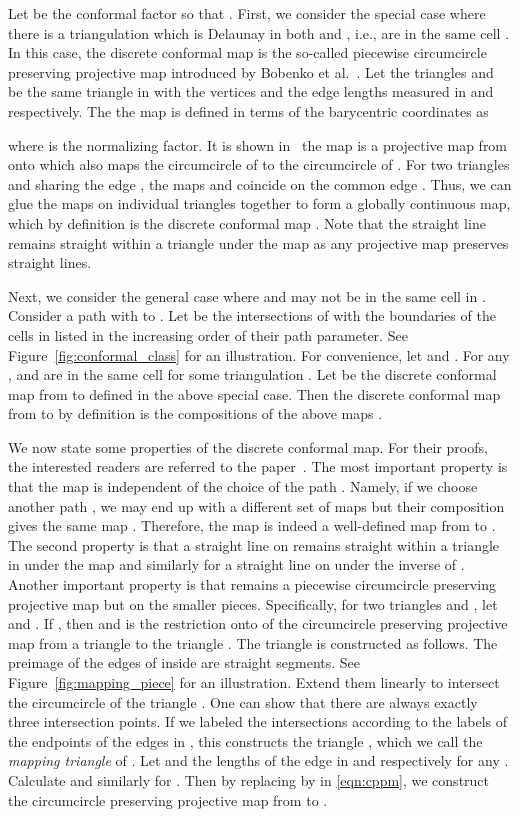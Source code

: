\documentclass[11pt]{article}
\begin{document}
Let  be the conformal factor so that . 
First, we consider the special case where there is a triangulation  which 
is Delaunay in both  and , i.e.,   are in the same cell .
In this case, the discrete conformal map is the so-called piecewise circumcircle
preserving projective map introduced by Bobenko et al.~\cite{bps}. 
Let the triangles  and  be the same triangle in  with 
the vertices  and the edge lengths measured in  and  respectively. The 
the map
 is defined in terms of the barycentric coordinates as

where  is the normalizing factor. 
It is shown in~\cite{bps} the map  is a projective map from 
onto  which also maps the circumcircle of  to the circumcircle
of . For two triangles  and  sharing the 
edge , the maps  and   coincide on the 
common edge . Thus, we can glue the maps on individual triangles together
to form a globally continuous map, which by definition is the discrete conformal map
. Note that the straight line remains 
straight within a triangle under the map  as any projective map preserves straight lines. 

Next, we consider the general case where  and  may not be in the same cell in .
Consider a path  with  to . 
Let  be the intersections of   with the boundaries of the cells
in  listed in the increasing order of their path parameter. See Figure~\ref{fig:conformal_class}
for an illustration. For convenience, let
 and . For any ,   and  are in the 
same cell  for some triangulation . 
Let  be the discrete conformal map from  to
 defined in the above special case. Then the discrete conformal map from  to  
by definition is the compositions of the above maps .

We now state some properties of the discrete conformal map. For their proofs, the interested readers
are referred to the paper~\cite{glsw2}. The most important property is that the map  is 
independent of the choice of the path . Namely, if we choose another path , 
we may end up with a different set of maps  but their composition 
gives the same map . Therefore, the map  is indeed a well-defined map from  to . 
The second property is that a straight line on  
remains straight within a triangle in  under the map  and similarly for a straight line 
on  under the inverse of . Another important property is
that  remains a piecewise circumcircle preserving projective map but on the smaller pieces. 
Specifically, for two triangles  and , let  
and . If , then  and 
 is the restriction onto  of the circumcircle preserving projective
map from a triangle  to the triangle . The triangle  is constructed as 
follows.  The preimage of the edges of  inside  are straight segments. 
See Figure~\ref{fig:mapping_piece} for an illustration. 
Extend them linearly to intersect the circumcircle of the triangle . One can show that there are always 
exactly three intersection points. If we labeled the intersections according to the labels of the endpoints of 
the edges in , this constructs the triangle , which we call the {\it mapping triangle} of . 
Let  and  the lengths of the edge  in  and  respectively for 
any .  Calculate  and similarly 
for . Then by replacing  by  in \eqref{eqn:cppm}, we construct the circumcircle preserving
projective map from  to . 
\end{document}
